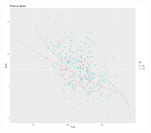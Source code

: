 \begin{frame}
\begin{center}
	\includegraphics[width = 3in]{SalesPriceUSPoly3.png}
\end{center}
\end{frame}




 